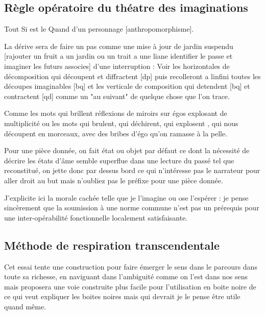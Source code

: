 \documentclass{article}
\begin{document}
\subsection{Règle opératoire du théatre des imaginations}

Tout Si est le Quand d'un personnage [anthropomorphisme].

La dérive sera de faire un pas  comme une mise à jour de jardin suspendu [rajouter un fruit  a un jardin ou un trait a une liane identifier le passe et imaginer les futurs associes] d'une interruption :
Voir  les  horizontales de décomposition qui découpent et diffractent [dp] puis  recolleront a linfini  toutes les découpes imaginables [bq]
 et les verticale de composition qui detendent [bq] et contractent [qd] comme un "au suivant" de quelque chose que l'on trace. 
 
 Comme les mots qui brillent réflexions de miroirs sur égos explosant de multiplicité ou les mots qui brulent, qui déchirent, qui explosent , qui nous découpent en morceaux,  avec des bribes d'égo qu'on ramasse à la pelle.
 

Pour une pièce donnée, on fait état ou objet par défaut  ce dont la nécessité de décrire les états d'âme semble superflue dans une  lecture du passé tel que reconstitué, on jette donc par dessus bord ce qui n'intéresse pas le narrateur pour aller droit au but mais n'oubliez pas le préfixe pour une pièce donnée.
 
 J'explicite ici la morale cachée telle que je l'imagine ou ose l'espérer : je pense sincèrement que  la soumission à une norme commune n'est pas un prérequis pour une inter-opérabilité fonctionnelle localement satisfaisante.

\subsection{Méthode de respiration transcendentale}
Cet essai tente une construction pour faire émerger le sens dans le parcours dans toute sa richesse, en naviguant dans l'ambiguité comme on l'est dans nos sens mais  proposera 
une voie construite plus facile pour l'utilisation en boite noire de ce qui veut expliquer les boites noires mais qui devrait je le pense être utile quand même.
 
\end{document}
